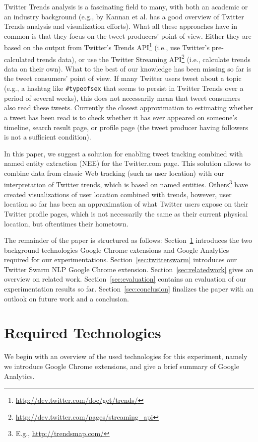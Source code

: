 \documentclass[runningheads,a4paper]{llncs}
\begin{document}
Twitter Trends analysis is a fascinating field to many, with both an academic or an industry background (e.g., \cite{Kannan:Trendtracker} by Kannan et al. has a good overview of Twitter Trends analysis and visualization efforts). What all these approaches have in common is that they focus on the tweet producers' point of view. Either they are based on the output from Twitter's Trends API\footnote{\url{http://dev.twitter.com/doc/get/trends/}} (i.e., use Twitter's pre-calculated trends data), or use the Twitter Streaming API\footnote{\url{http://dev.twitter.com/pages/streaming_api}} (i.e., calculate trends data on their own). What to the best of our knowledge has been missing so far is the tweet consumers' point of view. If many Twitter users tweet about a topic (e.g., a hashtag like \texttt{\#typeofsex} that seems to persist in Twitter Trends over a period of several weeks), this does not necessarily mean that tweet consumers also read these tweets. Currently the closest approximation to estimating whether a tweet has been read is to check whether it has ever appeared on someone's timeline, search result page, or profile page (the tweet producer having followers is not a sufficient condition).

In this paper, we suggest a solution for enabling tweet tracking combined with named entity extraction (NEE) for the Twitter.com page. This solution allows to combine data from classic Web tracking (such as user location) with our interpretation of Twitter trends, which is based on named entities. Others\footnote{E.g., \url{http://trendsmap.com/}} have created visualizations of user location combined with trends, however, user location so far has been an approximation of what Twitter users expose on their Twitter profile pages, which is not necessarily the same as their current physical location, but oftentimes their hometown. 

The remainder of the paper is structured as follows: Section~\ref{sec:reqtec} introduces the two background technologies Google Chrome extensions and Google Analytics required for our experimentations. Section~\ref{sec:twitterswarm} introduces our Twitter Swarm NLP Google Chrome extension. Section~\ref{sec:relatedwork} gives an overview on related work. Section~\ref{sec:evaluation} contains an evaluation of our experimentation results so far. Section~\ref{sec:conclusion} finalizes the paper with an outlook on future work and a conclusion.

\section{Required Technologies}\label{sec:reqtec}
We begin with an overview of the used technologies for this experiment, namely we introduce Google Chrome extensions, and give a brief summary of Google Analytics.
\end{document}
